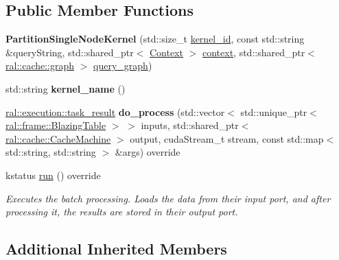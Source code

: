 \subsection*{Public Member Functions}
\begin{DoxyCompactItemize}
\item 
\mbox{\label{classral_1_1batch_1_1PartitionSingleNodeKernel_ad0e6afd26027121b3e2659c9603b954e}} 
{\bfseries Partition\+Single\+Node\+Kernel} (std\+::size\+\_\+t \hyperlink{classral_1_1cache_1_1kernel_a2fd708656cb056a41ec635b8bdc4acfe}{kernel\+\_\+id}, const std\+::string \&query\+String, std\+::shared\+\_\+ptr$<$ \hyperlink{classblazingdb_1_1manager_1_1Context}{Context} $>$ \hyperlink{classral_1_1cache_1_1kernel_af0347d14d678cfa7205c1387746a2e1b}{context}, std\+::shared\+\_\+ptr$<$ \hyperlink{classral_1_1cache_1_1graph}{ral\+::cache\+::graph} $>$ \hyperlink{classral_1_1cache_1_1kernel_a5fbb02292aff165a28ef25e75f0d89bd}{query\+\_\+graph})
\item 
\mbox{\label{classral_1_1batch_1_1PartitionSingleNodeKernel_a35cd076439096c61775993ca63e8e266}} 
std\+::string {\bfseries kernel\+\_\+name} ()
\item 
\mbox{\label{classral_1_1batch_1_1PartitionSingleNodeKernel_af42971c7b8836935ff44cda59b71be7d}} 
\hyperlink{structral_1_1execution_1_1task__result}{ral\+::execution\+::task\+\_\+result} {\bfseries do\+\_\+process} (std\+::vector$<$ std\+::unique\+\_\+ptr$<$ \hyperlink{classral_1_1frame_1_1BlazingTable}{ral\+::frame\+::\+Blazing\+Table} $>$ $>$ inputs, std\+::shared\+\_\+ptr$<$ \hyperlink{classral_1_1cache_1_1CacheMachine}{ral\+::cache\+::\+Cache\+Machine} $>$ output, cuda\+Stream\+\_\+t stream, const std\+::map$<$ std\+::string, std\+::string $>$ \&args) override
\item 
kstatus \hyperlink{classral_1_1batch_1_1PartitionSingleNodeKernel_a5af293b33505bec1e9fb66f9bb9d29af}{run} () override
\begin{DoxyCompactList}\small\item\em Executes the batch processing. Loads the data from their input port, and after processing it, the results are stored in their output port. \end{DoxyCompactList}\end{DoxyCompactItemize}
\subsection*{Additional Inherited Members}


